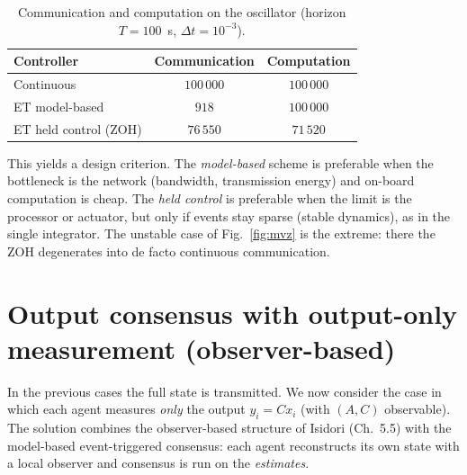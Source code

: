 \documentclass[11pt,a4paper]{article}
\theoremstyle{remark}
\begin{document}
\begin{table}[H]
\centering
\caption{Communication and computation on the oscillator (horizon $T=100$~s, $\Delta t=10^{-3}$).}
\label{tab:comp}
\begin{tabular}{lcc}
\toprule
Controller & Communication & Computation \\
\midrule
Continuous           & $100\,000$ & $100\,000$ \\
ET model-based       & $918$      & $100\,000$ \\
ET held control (ZOH)& $76\,550$  & $71\,520$  \\
\bottomrule
\end{tabular}
\end{table}

This yields a design criterion. The \emph{model-based} scheme is preferable when the bottleneck is
the network (bandwidth, transmission energy) and on-board computation is cheap. The \emph{held
control} is preferable when the limit is the processor or actuator, but only if events stay sparse
(stable dynamics), as in the single integrator. The unstable case of Fig.~\ref{fig:mvz} is the
extreme: there the ZOH degenerates into de facto continuous communication.

\FloatBarrier
\section{Output consensus with output-only measurement (observer-based)}
\label{sec:output}
In the previous cases the full state is transmitted. We now consider the case in which each agent
measures \emph{only} the output $y_i = Cx_i$ (with $(A,C)$ observable). The solution combines the
observer-based structure of Isidori (Ch.~5.5) with the model-based event-triggered consensus: each
agent reconstructs its own state with a local observer and consensus is run on the \emph{estimates}.
\end{document}

